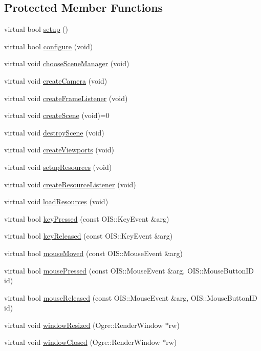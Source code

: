 \subsection*{Protected Member Functions}
\begin{DoxyCompactItemize}
\item 
virtual bool \hyperlink{classBaseGame_ae8b6fbfd480b0bfac0e260f03abf1b3e}{setup} ()
\item 
virtual bool \hyperlink{classBaseGame_a3cd0f813571cb0f0aa1dd561b3846cad}{configure} (void)
\item 
virtual void \hyperlink{classBaseGame_aad9855859d12f955cdf0346ff9df5975}{choose\-Scene\-Manager} (void)
\item 
virtual void \hyperlink{classBaseGame_a0e5919f248f607ebb4845665604f8aaf}{create\-Camera} (void)
\item 
virtual void \hyperlink{classBaseGame_a897c1961eac8082ff2a183e4a8521cfc}{create\-Frame\-Listener} (void)
\item 
virtual void \hyperlink{classBaseGame_ab3c23261333805b59b4cdf2edafea065}{create\-Scene} (void)=0
\item 
virtual void \hyperlink{classBaseGame_ac27bb4d673e4eb3f70467b9384cf184a}{destroy\-Scene} (void)
\item 
virtual void \hyperlink{classBaseGame_abb3740c564c2f6f8867fbaea643e951f}{create\-Viewports} (void)
\item 
virtual void \hyperlink{classBaseGame_a5e0e6f03394f7d3c2a6b59e7f5f1a0ad}{setup\-Resources} (void)
\item 
virtual void \hyperlink{classBaseGame_aef55ec02c7b7ff4250b2a8f63a9ec53d}{create\-Resource\-Listener} (void)
\item 
virtual void \hyperlink{classBaseGame_af120c71b5b2da400dce56d91f7e2960d}{load\-Resources} (void)
\item 
virtual bool \hyperlink{classBaseGame_a6b658a490b6aa454639c8080d503ac0a}{key\-Pressed} (const O\-I\-S\-::\-Key\-Event \&arg)
\item 
virtual bool \hyperlink{classBaseGame_a0618efac0dfc254a93e1725d892ccba7}{key\-Released} (const O\-I\-S\-::\-Key\-Event \&arg)
\item 
virtual bool \hyperlink{classBaseGame_aad37748d0aa0ca6adfe0cd33b068b2a8}{mouse\-Moved} (const O\-I\-S\-::\-Mouse\-Event \&arg)
\item 
virtual bool \hyperlink{classBaseGame_a73de286260f1478e877127c8723cddcb}{mouse\-Pressed} (const O\-I\-S\-::\-Mouse\-Event \&arg, O\-I\-S\-::\-Mouse\-Button\-I\-D id)
\item 
virtual bool \hyperlink{classBaseGame_a8b98e28df7c7ea23e2bcd389d140ad76}{mouse\-Released} (const O\-I\-S\-::\-Mouse\-Event \&arg, O\-I\-S\-::\-Mouse\-Button\-I\-D id)
\item 
virtual void \hyperlink{classBaseGame_abac0b7115e172de2675b4bf09ba8ed47}{window\-Resized} (Ogre\-::\-Render\-Window $\ast$rw)
\item 
virtual void \hyperlink{classBaseGame_adf1c158b4a92810f50c6c626be0d4757}{window\-Closed} (Ogre\-::\-Render\-Window $\ast$rw)
\end{DoxyCompactItemize}
